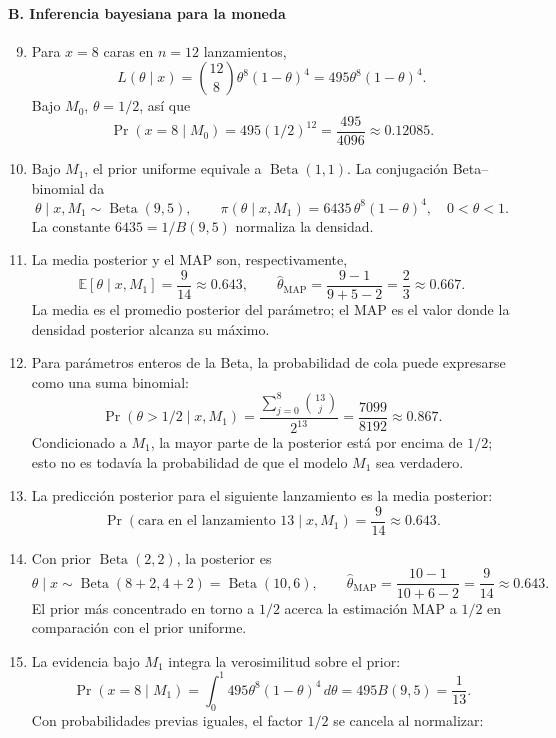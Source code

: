 \paragraph*{B. Inferencia bayesiana para la moneda}
\begin{enumerate}
  \setcounter{enumi}{8}
  \item Para $x=8$ caras en $n=12$ lanzamientos,
  \[
    L(\theta\mid x)=\binom{12}{8}\theta^8(1-\theta)^4
    =495\theta^8(1-\theta)^4.
  \]
  Bajo $M_0$, $\theta=1/2$, así que
  \[
    \Pr(x=8\mid M_0)=495(1/2)^{12}=\frac{495}{4096}\approx0.12085.
  \]
  \item Bajo $M_1$, el prior uniforme equivale a $\operatorname{Beta}(1,1)$. La conjugación Beta--binomial da
  \[
    \theta\mid x,M_1\sim\operatorname{Beta}(9,5),
    \qquad
    \pi(\theta\mid x,M_1)=6435\,\theta^8(1-\theta)^4,
    \quad 0<\theta<1.
  \]
  La constante $6435=1/B(9,5)$ normaliza la densidad.
  \item La media posterior y el MAP son, respectivamente,
  \[
    \mathbb E[\theta\mid x,M_1]=\frac{9}{14}\approx0.643,
    \qquad
    \widehat\theta_{\mathrm{MAP}}=\frac{9-1}{9+5-2}=\frac{2}{3}\approx0.667.
  \]
  La media es el promedio posterior del parámetro; el MAP es el valor donde la densidad posterior alcanza su máximo.
  \item Para parámetros enteros de la Beta, la probabilidad de cola puede expresarse como una suma binomial:
  \[
    \Pr(\theta>1/2\mid x,M_1)
    =\frac{\sum_{j=0}^{8}\binom{13}{j}}{2^{13}}
    =\frac{7099}{8192}\approx0.867.
  \]
  Condicionado a $M_1$, la mayor parte de la posterior está por encima de $1/2$; esto no es todavía la probabilidad de que el modelo $M_1$ sea verdadero.
  \item La predicción posterior para el siguiente lanzamiento es la media posterior:
  \[
    \Pr(\text{cara en el lanzamiento 13}\mid x,M_1)=\frac{9}{14}\approx0.643.
  \]
  \item Con prior $\operatorname{Beta}(2,2)$, la posterior es
  \[
    \theta\mid x\sim\operatorname{Beta}(8+2,4+2)=\operatorname{Beta}(10,6),
    \qquad
    \widehat\theta_{\mathrm{MAP}}=\frac{10-1}{10+6-2}=\frac{9}{14}\approx0.643.
  \]
  El prior más concentrado en torno a $1/2$ acerca la estimación MAP a $1/2$ en comparación con el prior uniforme.
  \item La evidencia bajo $M_1$ integra la verosimilitud sobre el prior:
  \[
    \Pr(x=8\mid M_1)=\int_0^1 495\theta^8(1-\theta)^4\,d\theta
    =495B(9,5)=\frac{1}{13}.
  \]
  Con probabilidades previas iguales, el factor $1/2$ se cancela al normalizar:

\end{enumerate}
